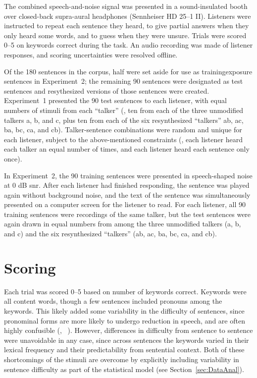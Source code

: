 The combined speech-and-noise signal was presented in a sound-insulated booth over closed-back supra-aural headphones (Sennheiser HD 25–1 II).  Listeners were instructed to repeat each sentence they heard, to give partial answers when they only heard some words, and to guess when they were unsure.  Trials were scored 0–5 on keywords correct during the task.  An audio recording was made of listener responses, and scoring uncertainties were resolved offline.  

Of the 180 sentences in the corpus, half were set aside for use as training\slsh{}exposure sentences in Experiment~2; the remaining 90 sentences were designated as test sentences and resythesized versions of those sentences were created.  Experiment~1 presented the 90 test sentences to each listener, with equal numbers of stimuli from each “talker” (\ie, ten from each of the three unmodified talkers \ac{a}, \ac{b}, and \ac{c}, plus ten from each of the six resynthesized “talkers” \ac{ab}, \ac{ac}, \ac{ba}, \ac{bc}, \ac{ca}, and \ac{cb}).  Talker-sentence combinations were random and unique for each listener, subject to the above-mentioned constraints (\ie, each listener heard each talker an equal number of times, and each listener heard each sentence only once).

In Experiment~2, the 90 training sentences were presented in speech-shaped noise at 0 dB \ac{snr}.  After each listener had finished responding, the sentence was played again without background noise, and the text of the sentence was simultaneously presented on a computer screen for the listener to read.  For each listener, all 90 training sentences were recordings of the same talker, but the test sentences were again drawn in equal numbers from among the three unmodified talkers (\ac{a}, \ac{b}, and \ac{c}) and the six resynthesized “talkers” (\ac{ab}, \ac{ac}, \ac{ba}, \ac{bc}, \ac{ca}, and \ac{cb}).

\section{Scoring\label{sec:Scoring}}
Each trial was scored 0–5 based on number of keywords correct.  Keywords were all content words, though a few sentences included pronouns among the keywords.  This likely added some variability in the difficulty of sentences, since pronominal forms are more likely to undergo reduction in speech, and are often highly confusible (\eg,  \vs\ ).  However, differences in difficulty from sentence to sentence were unavoidable in any case, since across sentences the keywords varied in their lexical frequency and their predictability from sentential context.  Both of these shortcomings of the stimuli are overcome by explicitly including variability in sentence difficulty as part of the statistical model (see Section~\ref{sec:DataAnal}).

